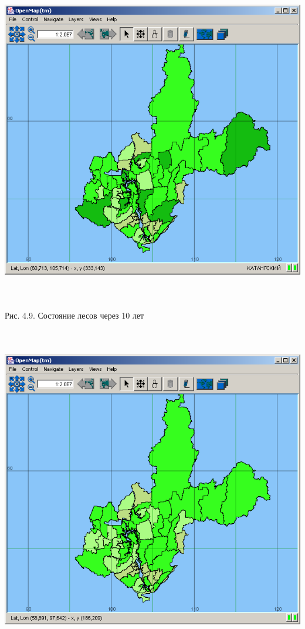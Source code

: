 \documentclass{article}
\begin{document}
\begin{center}
\includegraphics[width=452pt, height=407pt, keepaspectratio=true]{asyaDisser9_3-fig020.png}

Рис. 4.9. Состояние  лесов через 10 лет

\includegraphics[width=452pt, height=407pt, keepaspectratio=true]{asyaDisser9_3-fig021.png}


\end{center}
\end{document}
